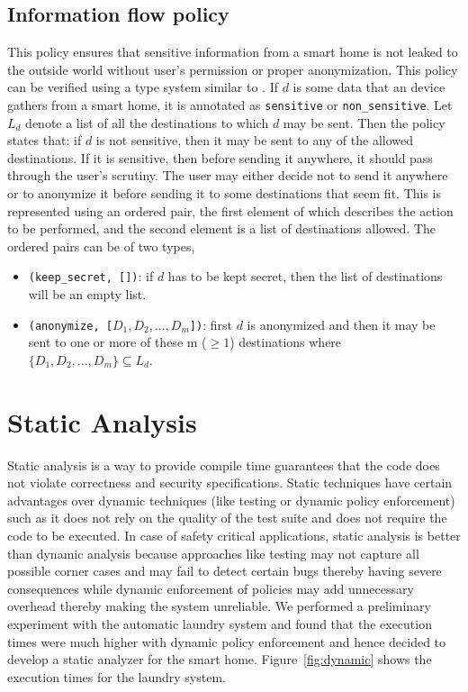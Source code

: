 \documentclass{article}
\begin{document}
\subsection{Information flow policy}
\label{subsec:information}
This policy ensures that sensitive information from a smart home is not leaked to the outside world without user's permission or proper anonymization.
This policy can be verified using a type system similar to \cite{ernst}. If $d$ is some data that an device gathers from a smart home, it is annotated as \texttt{sensitive} or \texttt{non\_sensitive}. 
Let $L_d$ denote a list of all the destinations to which $d$ may be sent. Then the policy states that: if $d$ is not sensitive, then it may be sent to any of the allowed destinations. If it is sensitive, then before sending it anywhere, it should pass through the user's scrutiny. The user may either decide not to send it anywhere or to anonymize it before sending it to some destinations that seem fit. This is represented using an ordered pair, the first element of which describes the action to be performed, and the second element is a list of destinations allowed. The ordered pairs can be of two types, \vspace{-7pt}
\begin{itemize}
\itemsep0em 
\item \texttt{(keep\_secret, [])}: if $d$ has to be kept secret, then the list of destinations will be an empty list.
\item \texttt{(anonymize, [$D_1, D_2, ..., D_m$])}: first $d$ is anonymized and then it may be sent to one or more of these m ($\geq1$) destinations where $\{D_1, D_2, ..., D_m\} \subseteq L_d$. 
\end{itemize}

\section{Static Analysis}
\label{sec:analysis}
Static analysis is a way to provide compile time guarantees that the code does not violate correctness and security specifications. Static techniques have certain advantages over dynamic techniques (like testing or dynamic policy enforcement) such as it does not rely on the quality of the test suite and does not require the code to be executed. In case of safety critical applications, static analysis is better than dynamic analysis because approaches like testing may not capture all possible corner cases and may fail to detect certain bugs thereby having severe consequences while dynamic enforcement of policies may add unnecessary overhead thereby making the system unreliable. We performed a preliminary experiment with the automatic laundry system and found that the execution times were much higher with dynamic policy enforcement and hence decided to develop a static analyzer for the smart home. Figure~\ref{fig:dynamic} shows the execution times for the laundry system. 
\end{document}
